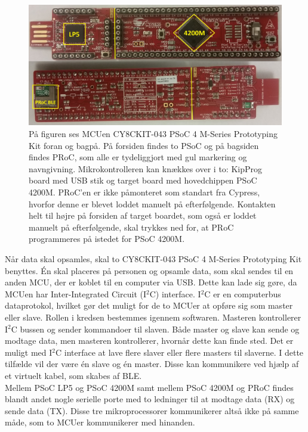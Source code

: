 \begin{figure}[H]
	\centering
	\includegraphics[scale=0.15]{figures/bProblemloesning/PSoC3.jpg}
	\caption{På figuren ses MCUen CY8CKIT-043 PSoC 4 M-Series Prototyping Kit foran og bagpå. På forsiden findes to PSoC og på bagsiden findes PRoC, som alle er tydeliggjort med gul markering og navngivning. Mikrokontrolleren kan knækkes over i to: KipProg board med USB stik og target board med hovedchippen PSoC 4200M. PRoC'en er ikke påmonteret som standart fra Cypress, hvorfor denne er blevet loddet manuelt på efterfølgende. Kontakten helt til højre på forsiden af target boardet, som også er loddet manuelt på efterfølgende, skal trykkes ned for, at PRoC programmeres på istedet for PSoC 4200M. \citep{CYPRESS2016PSoC,Semiconductor2016}}
	\label{fig:PSoC}
\end{figure}\vspace{-0.2cm}
Når data skal opsamles, skal to CY8CKIT-043 PSoC 4 M-Series Prototyping Kit benyttes. Én skal placeres på personen og opsamle data, som skal sendes til en anden MCU, der er koblet til en computer via USB. Dette kan lade sig gøre, da MCUen har Inter-Integrated Circuit (I$^{2}$C) interface. I$^{2}$C er en computerbus dataprotokol, hvilket gør det muligt for de to MCUer at opføre sig som master eller slave. Rollen i kredsen bestemmes igennem softwaren. Masteren kontrollerer I$^{2}$C bussen og sender kommandoer til slaven. Både master og slave kan sende og modtage data, men masteren kontrollerer, hvornår dette kan finde sted. Det er muligt med I$^{2}$C interface at lave flere slaver eller flere masters til slaverne. I dette tilfælde vil der være én slave og én master. Disse kan kommunikere ved hjælp af et virtuelt kabel, som skabes af BLE. \citep{Semiconductor2016,Sparkfun2016}\\
Mellem PSoC LP5 og PSoC 4200M samt mellem PSoC 4200M og PRoC findes blandt andet nogle serielle porte med to ledninger til at modtage data (RX) og sende data (TX). Disse tre mikroprocessorer kommunikerer altså ikke på samme måde, som to MCUer kommunikerer med hinanden. \citep{Semiconductor2016} \\
